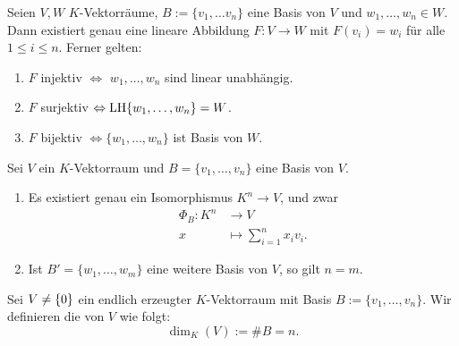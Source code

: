\setcounter{definition}{14}
\begin{satz}
	\label{satz:I.8.15}
	Seien $V,W$ $K$-Vektorräume, $B := \{v_1,\dots v_n\}$ eine Basis von $V$ und $w_1,\dots,w_n \in W$.
	Dann existiert genau eine lineare Abbildung $F \colon V \rightarrow W$ mit $F(v_i) = w_i$ für alle $1 \leq i \leq n$.
	Ferner gelten:
	\begin{enumerate}[(1)]
		\item $F$ injektiv $\Leftrightarrow$ $w_1,\dots, w_n$ sind linear unabhängig.
		\item $F$ surjektiv $\Leftrightarrow \operatorname{LH}\{w_1,\dots,w_n\} = W$.
		\item $F$ bijektiv $\Leftrightarrow \{w_1,\dots,w_n\}$ ist Basis von $W$.
	\end{enumerate}
\end{satz}

\begin{korollar}
	\label{kor:I.8.16}
	Sei $V$ ein $K$-Vektorraum und $B = \{v_1,\dots,v_n\}$ eine Basis von $V$.
	\begin{enumerate}[(1)]
		\item	Es existiert genau ein Isomorphismus $K^n \rightarrow V$, und zwar
		\begin{align*}
			\Phi_B \colon K^n &\longrightarrow V \\
			x &\longmapsto \sum_{i=1}^{n} x_iv_i.
		\end{align*}
		\item Ist $B' = \{w_1,\dots,w_m\}$ eine weitere Basis von $V$, so gilt $n = m$.
	\end{enumerate}
\end{korollar}

\begin{definition}[Dimension]
	\label{def:I.8.17}
	Sei $V \neq \{0\}$ ein endlich erzeugter $K$-Vektorraum mit Basis $B := \{v_1,\dots,v_n\}$. 
	Wir definieren die  von $V$ wie folgt:
	\[
		\dim_K(V) := \#B = n.
	\]
\end{definition}
\newpage